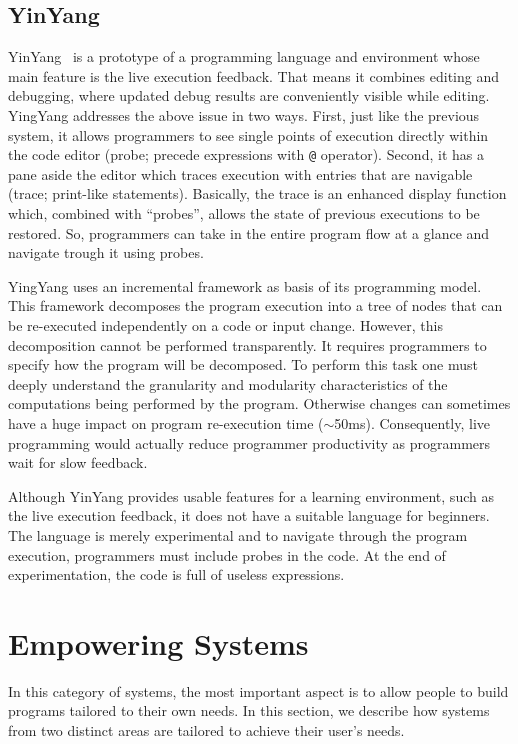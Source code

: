 \subsection{YinYang}
\label{subsec:yinyang}
YinYang~\cite{mcdirmid2013usable} is a prototype of a programming language and environment whose main feature is the live execution feedback. That means it combines editing and debugging, where updated debug results are conveniently visible while editing. YingYang addresses the above issue in two ways. First, just like the previous system, it allows programmers to see single points of execution directly within the code editor (probe; precede expressions with \texttt{@} operator). Second, it has a pane aside the editor which traces execution with entries that are navigable (trace; print-like statements). Basically, the trace is an enhanced display function which, combined with ``probes'', allows the state of previous executions to be restored. So, programmers can take in the entire program flow at a glance and navigate trough it using probes.

YingYang uses an incremental framework as basis of its programming model. This framework decomposes the program execution into a tree of nodes that can be re-executed independently on a code or input change. However, this decomposition cannot be performed transparently. It requires programmers to specify how the program will be decomposed. To perform this task one must deeply understand the granularity and modularity characteristics of the computations being performed by the program. Otherwise changes can sometimes have a huge impact on program re-execution time ($\sim$50ms). Consequently, live programming would actually reduce programmer productivity as programmers wait for slow feedback.

Although YinYang provides usable features for a learning environment, such as the live execution feedback, it does not have a suitable language for beginners. The language is merely experimental and to navigate through the program execution, programmers must include probes in the code. At the end of experimentation, the code is full of useless expressions.

\section{Empowering Systems}
\label{sec:es}
In this category of systems, the most important aspect is to allow people to build programs tailored to their own needs. In this section, we describe how systems from two distinct areas are tailored to achieve their user's needs. 

